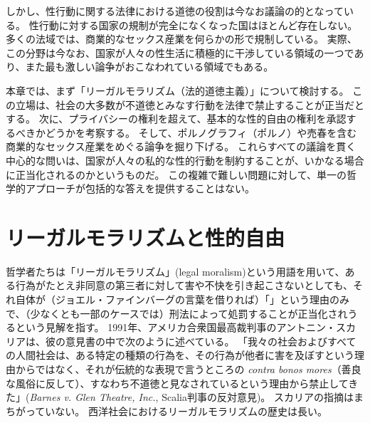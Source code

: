\documentclass[paper=a4,book,openany]{jlreq}
\begin{document}
しかし、性行動に関する法律における道徳の役割は今なお議論の的となっている。
性行動に対する国家の規制が完全になくなった国はほとんど存在しない。
多くの法域では、商業的なセックス産業を何らかの形で規制している。
実際、この分野は今なお、国家が人々の性生活に積極的に干渉している領域の一つであり、また最も激しい論争がおこなわれている領域でもある。

本章では、まず「リーガルモラリズム（法的道徳主義）」について検討する。
この立場は、社会の大多数が不道徳とみなす行動を法律で禁止することが正当だとする。
次に、プライバシーの権利を超えて、基本的な性的自由の権利を承認するべきかどうかを考察する。
そして、ポルノグラフィ（ポルノ）や売春を含む商業的なセックス産業をめぐる論争を掘り下げる。
これらすべての議論を貫く中心的な問いは、国家が人々の私的な性的行動を制約することが、いかなる場合に正当化されるのかというものだ。
この複雑で難しい問題に対して、単一の哲学的アプローチが包括的な答えを提供することはない。

\section{リーガルモラリズムと性的自由}

哲学者たちは「リーガルモラリズム」(legal moralism)という用語を用いて、ある行為がたとえ非同意の第三者に対して害や不快を引き起こさないとしても、それ自体が（ジョエル・ファインバーグの言葉を借りれば）「」という理由のみで、（少なくとも一部のケースでは）刑法によって処罰することが正当化されうるという見解を指す\citep[p.249]{feinberg87:_some_unswep_debris_hart_devlin_debat}。
1991年、アメリカ合衆国最高裁判事のアントニン・スカリアは、彼の意見書の中で次のように述べている。
「我々の社会およびすべての人間社会は、ある特定の種類の行為を、その行為が他者に害を及ぼすという理由からではなく、それが伝統的な表現で言うところの \emph{contra bonos mores}（善良な風俗に反して）、すなわち不道徳と見なされているという理由から禁止してきた」(\emph{Barnes v. Glen Theatre, Inc.}, Scalia判事の反対意見)。
スカリアの指摘はまちがっていない。
西洋社会におけるリーガルモラリズムの歴史は長い。
\end{document}
